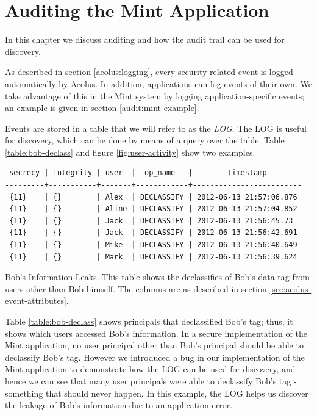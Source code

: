 \chapter{Auditing the Mint Application}
\label{mint:auditing}

In this chapter we discuss auditing and how the audit trail can be used for discovery.

As described in section \ref{aeolus:logging}, every security-related event is logged automatically by Aeolus. In addition, applications can log events of their own. We take advantage of this in the Mint system by logging application-specific events; an example is given in section \ref{audit:mint-example}.

Events are stored in a table that we will refer to as the \emph{LOG}. The LOG is useful for discovery, which can be done by means of a query over the table. Table \ref{table:bob-declass} and figure \ref{fig:user-activity} show two examples.

\begin{table}[h]
\begin{verbatim}
 secrecy | integrity | user  |  op_name   |        timestamp        
---------+-----------+-------+------------+-------------------------
 {11}    | {}        | Alex  | DECLASSIFY | 2012-06-13 21:57:06.876
 {11}    | {}        | Aline | DECLASSIFY | 2012-06-13 21:57:04.852
 {11}    | {}        | Jack  | DECLASSIFY | 2012-06-13 21:56:45.73
 {11}    | {}        | Jack  | DECLASSIFY | 2012-06-13 21:56:42.691
 {11}    | {}        | Mike  | DECLASSIFY | 2012-06-13 21:56:40.649
 {11}    | {}        | Mark  | DECLASSIFY | 2012-06-13 21:56:39.624
\end{verbatim}
\caption[Bob's Information Leaks]{Bob's Information Leaks. This table shows the declassifies of Bob's data tag from users other than Bob himself. The columns are as described in section \ref{sec:aeolus-event-attributes}.}
\label{table:bob-declass}
\end{table}

Table \ref{table:bob-declass} shows principals that declassified Bob's tag; thus, it shows which users accessed Bob's information. In a secure implementation of the Mint application, no user principal other than Bob's principal should be able to declassify Bob's tag. However we introduced a bug in our implementation of the Mint application to demonstrate how the LOG can be used for discovery, and hence we can see that many user principals were able to declassify Bob's tag - something that should never happen. In this example, the LOG helps us discover the leakage of Bob's information due to an application error.

